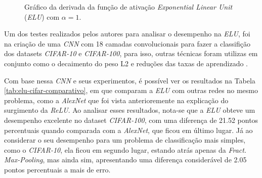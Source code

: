 \begin{figure}[h!]
    \centering
    \caption{Gráfico da derivada da função de ativação \textit{Exponential Linear Unit} (\textit{ELU}) com $\alpha=1$.}
    \label{fig:elu-derivada}
\end{figure}

Um dos testes realizados pelos autores para analisar o desempenho na \textit{ELU}, foi na criação de uma \textit{CNN} com 18 camadas convolucionais para fazer a classifição dos datasets \textit{CIFAR-10} e \textit{CIFAR-100}, para isso, outras técnicas foram utilizas em conjunto como o decaimento do peso L2 e reduções das taxas de aprendizado \parencite{ELUArticle}.

Com base nessa \textit{CNN} e seus experimentos, é possível ver os resultados na Tabela \ref{tab:elu-cifar-comparativo}, em que \textcite{ELUArticle} comparam a \textit{ELU} com outras redes no mesmo problema, como a \textit{AlexNet} que foi vista anterioremente na explicação do surgimento da \textit{ReLU}. Ao analisar esses resultados, nota-se que a \textit{ELU} obteve um desempenho excelente no dataset \textit{CIFAR-100}, com uma diferença de 21.52 pontos percentuais quando comparada com a \textit{AlexNet}, que ficou em último lugar. Já ao considerar o seu desempenho para um problema de classificação mais simples, como o \textit{CIFAR-10}, ela ficou em segundo lugar, estando atrás apenas da \textit{Fract. Max-Pooling}, mas ainda sim, apresentando uma diferença considerável de 2.05 pontos percentuais a mais de erro. 

